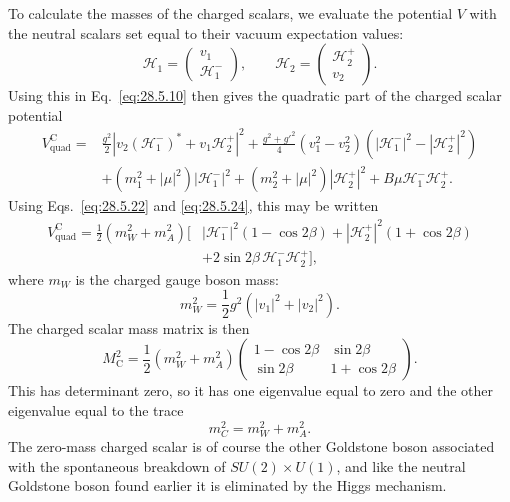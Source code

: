 To calculate the masses of the charged scalars, we evaluate the potential
\(V\) with the neutral scalars set equal to their vacuum expectation values:
\begin{equation}
  \mathcal{H}_1=
  \begin{pmatrix}
    v_1\\
    \mathcal{H}_1^-
  \end{pmatrix},
  \qquad
  \mathcal{H}_2=
  \begin{pmatrix}
    \mathcal{H}_2^+\\
    v_2
  \end{pmatrix}.
  \tag{28.5.30}\label{eq:28.5.30}
\end{equation}
Using this in Eq.~\eqref{eq:28.5.10} then gives the quadratic part of the
charged scalar potential
\begin{equation}
  \begin{aligned}
  V_{\mathrm{quad}}^{\mathrm C}
  ={}&
    \frac{g^2}{2}
      \left|v_2(\mathcal{H}_1^-)^*+v_1\mathcal{H}_2^+\right|^2
    +\frac{g^2+g'^2}{4}(v_1^2-v_2^2)
      \left(|\mathcal{H}_1^-|^2-|\mathcal{H}_2^+|^2\right)\\
  &+(m_1^2+|\mu|^2)|\mathcal{H}_1^-|^2
    +(m_2^2+|\mu|^2)|\mathcal{H}_2^+|^2
    +B\mu\mathcal{H}_1^-\mathcal{H}_2^+.
  \end{aligned}
  \tag{28.5.31}\label{eq:28.5.31}
\end{equation}
Using Eqs.~\eqref{eq:28.5.22} and \eqref{eq:28.5.24}, this may be written
\begin{equation}
  \begin{aligned}
  V_{\mathrm{quad}}^{\mathrm C}
  =\frac12(m_W^2+m_A^2)
    \bigl[
      &|\mathcal{H}_1^-|^2(1-\cos2\beta)
      +|\mathcal{H}_2^+|^2(1+\cos2\beta)\\
      &+2\sin2\beta\,\mathcal{H}_1^-\mathcal{H}_2^+
    \bigr],
  \end{aligned}
  \tag{28.5.32}\label{eq:28.5.32}
\end{equation}
where \(m_W\) is the charged gauge boson mass:
\begin{equation}
  m_W^2=\frac12g^2(|v_1|^2+|v_2|^2).
  \tag{28.5.33}\label{eq:28.5.33}
\end{equation}
The charged scalar mass matrix is then
\begin{equation}
  M_{\mathrm C}^2
  =\frac12(m_W^2+m_A^2)
  \begin{pmatrix}
    1-\cos2\beta & \sin2\beta\\
    \sin2\beta & 1+\cos2\beta
  \end{pmatrix}.
  \tag{28.5.34}\label{eq:28.5.34}
\end{equation}
This has determinant zero, so it has one eigenvalue equal to zero and the
other eigenvalue equal to the trace
\begin{equation}
  m_C^2=m_W^2+m_A^2.
  \tag{28.5.35}\label{eq:28.5.35}
\end{equation}
The zero-mass charged scalar is of course the other Goldstone boson
associated with the spontaneous breakdown of
\(SU(2)\times U(1)\), and like the neutral Goldstone boson found
earlier it is eliminated by the Higgs mechanism.

